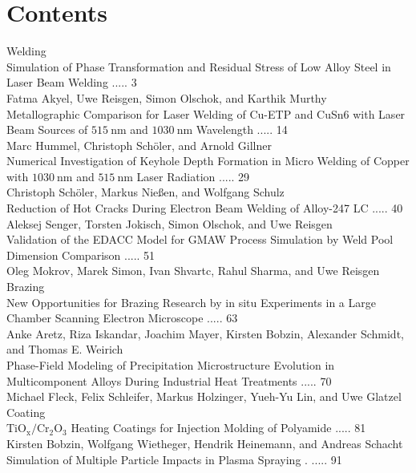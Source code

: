 \documentclass[10pt]{article}
\begin{document}
\section*{Contents}
Welding\\
Simulation of Phase Transformation and Residual Stress of Low Alloy Steel in Laser Beam Welding ..... 3\\
Fatma Akyel, Uwe Reisgen, Simon Olschok, and Karthik Murthy\\
Metallographic Comparison for Laser Welding of Cu-ETP and CuSn6 with Laser Beam Sources of $515 \mathrm{~nm}$ and $1030 \mathrm{~nm}$ Wavelength ..... 14\\
Marc Hummel, Christoph Schöler, and Arnold Gillner\\
Numerical Investigation of Keyhole Depth Formation in Micro Welding of Copper with $1030 \mathrm{~nm}$ and $515 \mathrm{~nm}$ Laser Radiation ..... 29\\
Christoph Schöler, Markus Nießen, and Wolfgang Schulz\\
Reduction of Hot Cracks During Electron Beam Welding of Alloy-247 LC ..... 40\\
Aleksej Senger, Torsten Jokisch, Simon Olschok, and Uwe Reisgen\\
Validation of the EDACC Model for GMAW Process Simulation by Weld Pool Dimension Comparison ..... 51\\
Oleg Mokrov, Marek Simon, Ivan Shvartc, Rahul Sharma, and Uwe Reisgen\\
Brazing\\
New Opportunities for Brazing Research by in situ Experiments in a Large Chamber Scanning Electron Microscope ..... 63\\
Anke Aretz, Riza Iskandar, Joachim Mayer, Kirsten Bobzin, Alexander Schmidt, and Thomas E. Weirich\\
Phase-Field Modeling of Precipitation Microstructure Evolution in Multicomponent Alloys During Industrial Heat Treatments ..... 70\\
Michael Fleck, Felix Schleifer, Markus Holzinger, Yueh-Yu Lin, and Uwe Glatzel\\
Coating\\
$\mathrm{TiO}_{\mathrm{x}} / \mathrm{Cr}_{2} \mathrm{O}_{3}$ Heating Coatings for Injection Molding of Polyamide ..... 81\\
Kirsten Bobzin, Wolfgang Wietheger, Hendrik Heinemann, and Andreas Schacht\\
Simulation of Multiple Particle Impacts in Plasma Spraying . ..... 91\\
\end{document}
